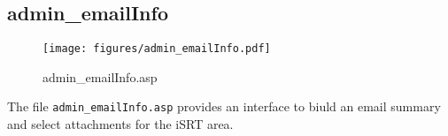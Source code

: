 \subsection{admin\_emailInfo}
\begin{figure}[htb]
    \begin{center}
        \texttt{[image: figures/admin\_emailInfo.pdf]}
    \end{center}
    \caption{admin\_emailInfo.asp}
    \label{fig:admin_emailInfo}
\end{figure}

The file \verb|admin_emailInfo.asp| provides an interface to biuld an email
summary and select attachments for the iSRT area.
